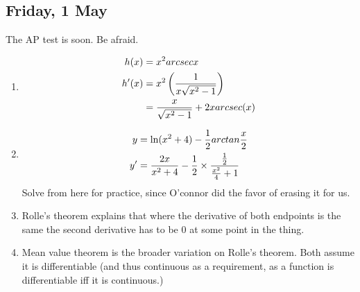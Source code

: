 \documentclass[11pt]{article}
\begin{document}
\subsection{Friday, 1 May}
The AP test is soon.  Be afraid.
\begin{enumerate}
	\item \begin{align}
			\setcounter{equation}{0}
			h(x) &= x^2 arcsec x\\
			h'(x) &= x^2\left(\frac{1}{x\sqrt{x^2-1}}\right)\\
								 &= \frac{x}{\sqrt{x^2-1}}+2xarcsec(x)
		\end{align}
	\item \begin{align}
			\setcounter{equation}{0}
			y &= \ln (x^2+4) - \frac{1}{2}arctan\frac{x}{2}\\
			y' &= \frac{2x}{x^2+4} - \frac{1}{2} \times \frac{\frac{1}{2}}
				{\frac{x^2}{4}+1} \\
		\end{align}
		Solve from here for practice, since O'connor did the favor of erasing it
		for us.
	\item Rolle's theorem explains that where the derivative of both endpoints 
		is the same the second derivative has to be 0 at some point in the thing.
	\item Mean value theorem is the broader variation on Rolle's theorem.  Both
		assume it is differentiable (and thus continuous as a requirement, as a
		function is differentiable iff it is continuous.)
\end{enumerate}
\end{document}
